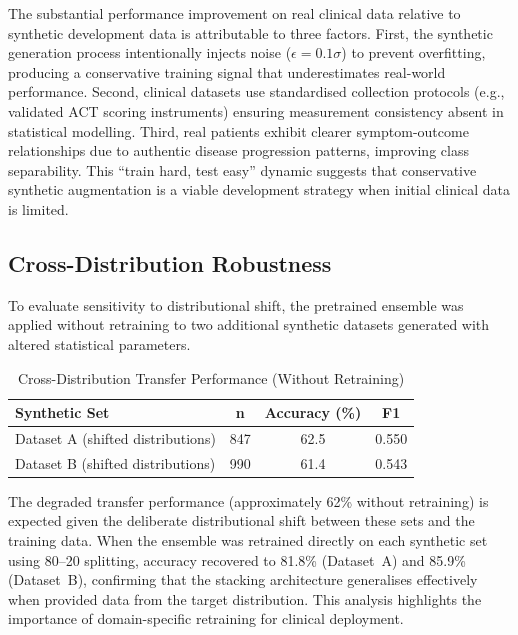 \documentclass[11pt,a4paper]{article}
\begin{document}
The substantial performance improvement on real clinical data relative to synthetic
development data is attributable to three factors. First, the synthetic generation
process intentionally injects noise ($\epsilon = 0.1\sigma$) to prevent overfitting,
producing a conservative training signal that underestimates real-world performance.
Second, clinical datasets use standardised collection protocols (e.g., validated ACT
scoring instruments) ensuring measurement consistency absent in statistical modelling.
Third, real patients exhibit clearer symptom-outcome relationships due to authentic
disease progression patterns, improving class separability. This ``train hard, test easy''
dynamic suggests that conservative synthetic augmentation is a viable development
strategy when initial clinical data is limited.

\subsection{Cross-Distribution Robustness}

To evaluate sensitivity to distributional shift, the pretrained ensemble was applied
without retraining to two additional synthetic datasets generated with altered
statistical parameters.

\begin{table}[H]
\centering
\caption{Cross-Distribution Transfer Performance (Without Retraining)}
\label{tab:crossdist}
\begin{tabular}{lccc}
\toprule
\textbf{Synthetic Set} & \textbf{n} & \textbf{Accuracy (\%)} & \textbf{F1} \\
\midrule
Dataset A (shifted distributions) & 847 & 62.5 & 0.550 \\
Dataset B (shifted distributions) & 990 & 61.4 & 0.543 \\
\bottomrule
\end{tabular}
\end{table}

The degraded transfer performance (approximately 62\% without retraining) is expected
given the deliberate distributional shift between these sets and the training data.
When the ensemble was retrained directly on each synthetic set using 80--20 splitting,
accuracy recovered to 81.8\% (Dataset~A) and 85.9\% (Dataset~B), confirming that the
stacking architecture generalises effectively when provided data from the target
distribution. This analysis highlights the importance of domain-specific retraining
for clinical deployment.
\end{document}
